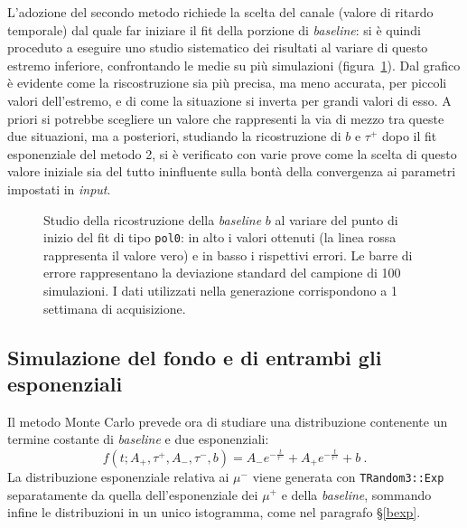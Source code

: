 \documentclass[10pt, oneside, a4paper]{article}   	%
\begin{document}
L'adozione del secondo metodo richiede la scelta del canale (valore di ritardo temporale) dal quale far iniziare il fit della porzione di \textit{baseline}: si è quindi proceduto a eseguire uno studio sistematico dei risultati al variare di questo estremo inferiore, confrontando le medie su più simulazioni (figura~\ref{baselinestart}). Dal grafico è evidente come la riscostruzione sia più precisa, ma meno accurata, per piccoli valori dell'estremo, e di come la situazione si inverta per grandi valori di esso. A priori si potrebbe scegliere un valore che rappresenti la via di mezzo tra queste due situazioni, ma a posteriori, studiando la ricostruzione di $b$ e $\tau^+$ dopo il fit esponenziale del metodo 2, si è verificato con varie prove come la scelta di questo valore iniziale sia del tutto ininfluente sulla bontà della convergenza ai parametri impostati in \textit{input}.
%
\begin{figure}[h]
  \centerline{}
  \caption{Studio della ricostruzione della \textit{baseline} $b$ al variare del punto di inizio del fit di tipo \texttt{pol0}: in alto i valori ottenuti (la linea rossa rappresenta il valore vero) e in basso i rispettivi errori. Le barre di errore rappresentano la deviazione standard del campione di 100 simulazioni. I dati utilizzati nella generazione corrispondono a 1 settimana di acquisizione.}\label{baselinestart}
\end{figure}
%
\subsection{Simulazione del fondo e di entrambi gli esponenziali}
Il metodo Monte Carlo prevede ora di studiare una distribuzione contenente un termine costante di \textit{baseline} e due esponenziali:
\begin{equation}
 f(t;A_+,\tau^+,A_-,\tau^-, b)=A_-e^{-\frac{t}{\tau^-}}+A_+e^{-\frac{t}{\tau^+}}+b\ .
 \label{eq::funzione_fit_finale}
\end{equation}
La distribuzione esponenziale relativa ai $\mu^-$ viene generata con \lstinline{TRandom3::Exp} separatamente da quella dell'esponenziale dei $\mu^+$ e della \textit{baseline}, sommando infine le distribuzioni in un unico istogramma, come nel paragrafo \S\ref{bexp}. 
\end{document}
